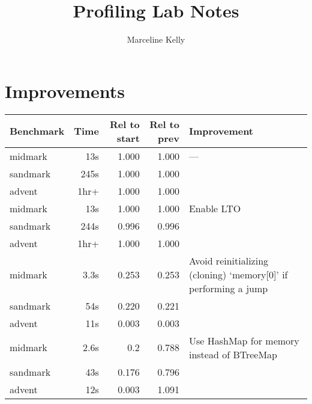 \documentclass{article}
\title{\textbf{Profiling Lab Notes}}
\author{Marceline Kelly}
\date{}
\begin{document}
\maketitle

\section*{Improvements}

\begin{tabulary}{\textwidth}{lrrrL}
    Benchmark & Time & Rel to start & Rel to prev & Improvement                                                     \\
    \hline
    midmark   & 13s  & 1.000        & 1.000       & ---                                                             \\
    sandmark  & 245s & 1.000        & 1.000       &                                                                 \\
    advent    & 1hr+ & 1.000        & 1.000       &                                                                 \\
    \hline
    midmark   & 13s  & 1.000        & 1.000       & Enable LTO                                                      \\
    sandmark  & 244s & 0.996        & 0.996       &                                                                 \\
    advent    & 1hr+ & 1.000        & 1.000       &                                                                 \\
    \hline
    midmark   & 3.3s & 0.253        & 0.253       & Avoid reinitializing (cloning) `memory[0]' if performing a jump \\
    sandmark  & 54s  & 0.220        & 0.221       &                                                                 \\
    advent    & 11s  & 0.003        & 0.003       &                                                                 \\
    \hline
    midmark   & 2.6s & 0.2          & 0.788       & Use HashMap for memory instead of BTreeMap                      \\
    sandmark  & 43s  & 0.176        & 0.796       &                                                                 \\
    advent    & 12s  & 0.003        & 1.091       &                                                                 \\

\end{tabulary}
\end{document}
